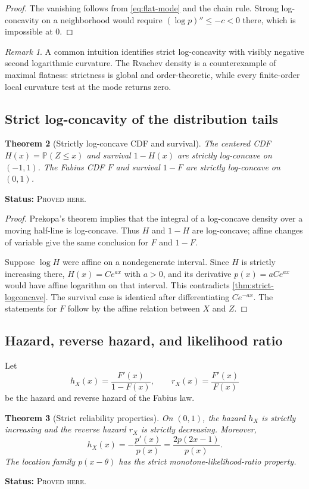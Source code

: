 \documentclass[11pt,oneside]{article}
\newtheorem{theorem}{Theorem}[section]
\theoremstyle{definition}
\theoremstyle{remark}
\newtheorem{remark}[theorem]{Remark}
\newcommand{\Prob}{\mathbb P}
\newcommand{\Pp}{\Prob}
\newcommand{\ProvedHere}{\textcolor{statusgreen}{\textsc{Proved here}}}
\newcommand{\Status}[1]{\par\smallskip\noindent\textbf{Status:} #1.\par\smallskip}
\begin{document}
\begin{proof}
The vanishing follows from \eqref{eq:flat-mode} and the chain rule.  Strong
log-concavity on a neighborhood would require $(\log p)''\le-c<0$ there, which
is impossible at $0$.
\end{proof}

\begin{remark}
A common intuition identifies strict log-concavity with visibly negative second
logarithmic curvature.  The Rvachev density is a counterexample of maximal
flatness: strictness is global and order-theoretic, while every finite-order local
curvature test at the mode returns zero.
\end{remark}

\subsection{Strict log-concavity of the distribution tails}
\begin{theorem}[Strictly log-concave CDF and survival]\label{thm:cdf-survival}
The centered CDF $H(x)=\Pp(Z\le x)$ and survival $1-H(x)$ are strictly
log-concave on $(-1,1)$.  The Fabius CDF $F$ and survival $1-F$ are strictly
log-concave on $(0,1)$.
\end{theorem}
\Status{\ProvedHere}

\begin{proof}
Prekopa's theorem implies that the integral of a log-concave density over a moving
half-line is log-concave.  Thus $H$ and $1-H$ are log-concave; affine changes of
variable give the same conclusion for $F$ and $1-F$.

Suppose $\log H$ were affine on a nondegenerate interval.  Since $H$ is strictly
increasing there, $H(x)=Ce^{ax}$ with $a>0$, and its derivative
$p(x)=aCe^{ax}$ would have affine logarithm on that interval.  This contradicts
\cref{thm:strict-logconcave}.  The survival case is identical after differentiating
$Ce^{-ax}$.  The statements for $F$ follow by the affine relation between $X$
and $Z$.
\end{proof}

\subsection{Hazard, reverse hazard, and likelihood ratio}
Let
\[
 h_X(x)=\frac{F'(x)}{1-F(x)},\qquad
 r_X(x)=\frac{F'(x)}{F(x)}
\]
be the hazard and reverse hazard of the Fabius law.

\begin{theorem}[Strict reliability properties]\label{thm:hazard}
On $(0,1)$, the hazard $h_X$ is strictly increasing and the reverse hazard
$r_X$ is strictly decreasing.  Moreover,
\begin{equation}\label{eq:hazard-score}
 h_X(x)=-\frac{p'(x)}{p(x)}
       =\frac{2p(2x-1)}{p(x)}.
\end{equation}
The location family $p(x-\theta)$ has the strict monotone-likelihood-ratio
property.
\end{theorem}
\Status{\ProvedHere}
\end{document}
